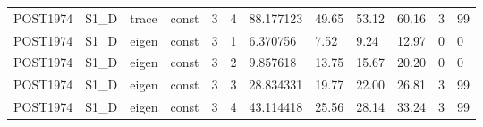 \begin{tabular}{llllllllllll}
POST1974 & S1\_D & trace & const & 3 & 4 & 88.177123 & 49.65 & 53.12 & 60.16 & 3 & 99 \\
POST1974 & S1\_D & eigen & const & 3 & 1 & 6.370756 & 7.52 & 9.24 & 12.97 & 0 & 0 \\
POST1974 & S1\_D & eigen & const & 3 & 2 & 9.857618 & 13.75 & 15.67 & 20.20 & 0 & 0 \\
POST1974 & S1\_D & eigen & const & 3 & 3 & 28.834331 & 19.77 & 22.00 & 26.81 & 3 & 99 \\
POST1974 & S1\_D & eigen & const & 3 & 4 & 43.114418 & 25.56 & 28.14 & 33.24 & 3 & 99 \\
\hline
\end{tabular}
